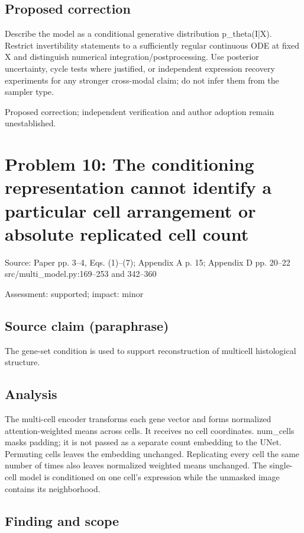 \documentclass[11pt]{article}
\begin{document}
\subsection*{Proposed correction}

Describe the model as a conditional generative distribution p\_theta(I|X). Restrict invertibility statements to a sufficiently regular continuous ODE at fixed X and distinguish numerical integration/postprocessing. Use posterior uncertainty, cycle tests where justified, or independent expression recovery experiments for any stronger cross-modal claim; do not infer them from the sampler type.

Proposed correction; independent verification and author adoption remain unestablished.

\section*{Problem 10: The conditioning representation cannot identify a particular cell arrangement or absolute replicated cell count}

Source: Paper pp. 3–4, Eqs. (1)–(7); Appendix A p. 15; Appendix D pp. 20–22 src/multi\_model.py:169–253 and 342–360

Assessment: supported; impact: minor

\subsection*{Source claim (paraphrase)}

The gene-set condition is used to support reconstruction of multicell histological structure.

\subsection*{Analysis}

The multi-cell encoder transforms each gene vector and forms normalized attention-weighted means across cells. It receives no cell coordinates. num\_cells masks padding; it is not passed as a separate count embedding to the UNet. Permuting cells leaves the embedding unchanged. Replicating every cell the same number of times also leaves normalized weighted means unchanged. The single-cell model is conditioned on one cell's expression while the unmasked image contains its neighborhood.

\subsection*{Finding and scope}
\end{document}
